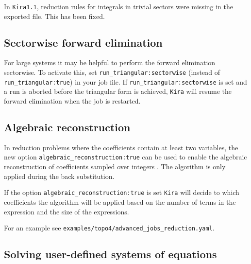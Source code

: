 \documentclass[a4paper,12pt]{article}
\newcommand*{\kira}{\texttt{Kira}}
\begin{document}
In \kira{}\;\texttt{1.1}, reduction rules for integrals in trivial sectors were
missing in the exported file. This has been fixed.


\subsection{Sectorwise forward elimination}

For large systems it may be helpful to perform the forward elimination
sectorwise.
To activate this, set \texttt{run\_triangular:\;sectorwise} (instead of
\texttt{run\_triangular:\;true}) in your job file.
If \texttt{run\_triangular:\;sectorwise} is set and a run is aborted before the
triangular form is achieved, \kira{} will resume the forward elimination when
the job is restarted.


\subsection{Algebraic reconstruction}

In reduction problems where the coefficients contain at least two variables, the
new option \texttt{algebraic\_reconstruction:\;true} can be used to enable the
algebraic reconstruction of coefficients sampled over integers
\cite{Larsen:2015ped,Boehm:2017wjc,Boehm:2018fpv}.
The algorithm is only applied during the back substitution.

If the option \texttt{algebraic\_reconstruction:\;true} is set \kira{} will
decide to which coefficients the algorithm will be applied based on the number
of terms in the expression and the size of the expressions.

\noindent
For an example see \texttt{examples/topo4/advanced\_jobs\_reduction.yaml}.


\subsection{Solving user-defined systems of equations}
\end{document}
